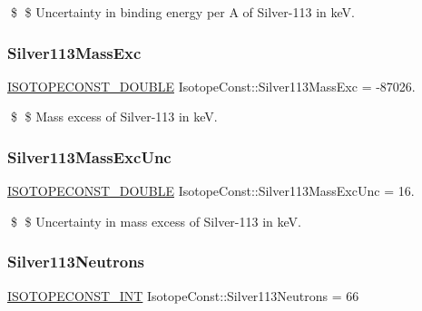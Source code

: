 \$ \$ Uncertainty in binding energy per A of Silver-\/113 in keV. \mbox{\label{group___isotope_const-_silver-_ag113_gad8c8a6c1bbd32045086c84b0637e3061}} 
\subsubsection{\texorpdfstring{Silver113\+Mass\+Exc}{Silver113MassExc}}
{\footnotesize\ttfamily \mbox{\hyperlink{group___isotope_const-_macros_ga8f45a7272ce02c0b4c65c44636ed719a}{I\+S\+O\+T\+O\+P\+E\+C\+O\+N\+S\+T\+\_\+\+D\+O\+U\+B\+LE}} Isotope\+Const\+::\+Silver113\+Mass\+Exc = -\/87026.}

\$ \$ Mass excess of Silver-\/113 in keV. \mbox{\label{group___isotope_const-_silver-_ag113_gaecf7737afc389465849a3dac1cc9a73f}} 
\subsubsection{\texorpdfstring{Silver113\+Mass\+Exc\+Unc}{Silver113MassExcUnc}}
{\footnotesize\ttfamily \mbox{\hyperlink{group___isotope_const-_macros_ga8f45a7272ce02c0b4c65c44636ed719a}{I\+S\+O\+T\+O\+P\+E\+C\+O\+N\+S\+T\+\_\+\+D\+O\+U\+B\+LE}} Isotope\+Const\+::\+Silver113\+Mass\+Exc\+Unc = 16.}

\$ \$ Uncertainty in mass excess of Silver-\/113 in keV. \mbox{\label{group___isotope_const-_silver-_ag113_gac1d6e89946cf383325ae126e5d169039}} 
\subsubsection{\texorpdfstring{Silver113\+Neutrons}{Silver113Neutrons}}
{\footnotesize\ttfamily \mbox{\hyperlink{group___isotope_const-_macros_ga5f18360b3e99483a35c32d789e62621c}{I\+S\+O\+T\+O\+P\+E\+C\+O\+N\+S\+T\+\_\+\+I\+NT}} Isotope\+Const\+::\+Silver113\+Neutrons = 66}

